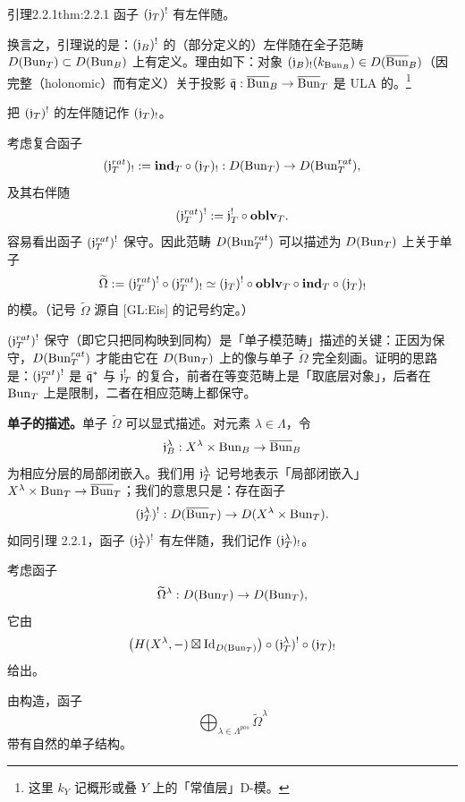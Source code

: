 \begin{othm}{引理}{2.2.1}{thm:2.2.1}
函子 $(\mathfrak{j}_T)^!$ 有左伴随。
\end{othm}

换言之，引理说的是：$(\mathfrak{j}_B)^!$ 的（部分定义的）左伴随在全子范畴 $D(\operatorname{Bun}_T)\subset D(\operatorname{Bun}_B)$ 上有定义。理由如下：对象 $(\mathfrak{j}_B)_!(k_{\operatorname{Bun}_B})\in D(\overline{\mathrm{Bun}}_B)$（因完整（holonomic）而有定义）关于投影 $\bar{\mathfrak{q}}:\overline{\mathrm{Bun}}_B\to\overline{\mathrm{Bun}}_T$ 是 ULA 的。\footnote{这里 $k_Y$ 记概形或叠 $Y$ 上的「常值层」D-模。}

把 $(\mathfrak{j}_T)^!$ 的左伴随记作 $(\mathfrak{j}_T)_!$。

考虑复合函子
\[
  (\mathfrak{j}^{rat}_T)_! := \mathbf{ind}_T\circ(\mathfrak{j}_T)_! : D(\operatorname{Bun}_T)\to D(\operatorname{Bun}^{rat}_T),
\]
及其右伴随
\[
  (\mathfrak{j}^{rat}_T)^! := \mathfrak{j}_T^!\circ \mathbf{oblv}_T .
\]
容易看出函子 $(\mathfrak{j}^{rat}_T)^!$ 保守。因此范畴 $D(\operatorname{Bun}^{rat}_T)$ 可以描述为 $D(\operatorname{Bun}_T)$ 上关于单子
\[
  \widetilde\Omega := (\mathfrak{j}^{rat}_T)^!\circ(\mathfrak{j}^{rat}_T)_!
  \simeq (\mathfrak{j}_T)^!\circ\mathbf{oblv}_T\circ\mathbf{ind}_T\circ(\mathfrak{j}_T)_!
\]
的模。（记号 $\widetilde\Omega$ 源自 [GL:Eis] 的记号约定。）

\begin{annote}
$(\mathfrak{j}^{rat}_T)^!$ 保守（即它只把同构映到同构）是「单子模范畴」描述的关键：正因为保守，$D(\operatorname{Bun}^{rat}_T)$ 才能由它在 $D(\operatorname{Bun}_T)$ 上的像与单子 $\widetilde\Omega$ 完全刻画。证明的思路是：$(\mathfrak{j}^{rat}_T)^!$ 是 $\bar{\mathfrak{q}}^*$ 与 $\mathfrak{j}_T^!$ 的复合，前者在等变范畴上是「取底层对象」，后者在 $\operatorname{Bun}_T$ 上是限制，二者在相应范畴上都保守。\par\vspace{0.15em}{\raggedleft 【来源：原书 p.4 §2.2.2（A）；译者按（上下文推断，无外部依据）】\par}
\end{annote}

\textbf{单子的描述。}单子 $\widetilde\Omega$ 可以显式描述。对元素 $\lambda\in\Lambda$，令
\[
  \mathfrak{j}_B^\lambda : X^\lambda\times\operatorname{Bun}_B\to\overline{\mathrm{Bun}}_B
\]
为相应分层的局部闭嵌入。我们用 $\mathfrak{j}_T^\lambda$ 记号地表示「局部闭嵌入」$X^\lambda\times\operatorname{Bun}_T\to\overline{\mathrm{Bun}}_T$；我们的意思只是：存在函子
\[
  (\mathfrak{j}_T^\lambda)^! : D(\overline{\mathrm{Bun}}_T)\to D(X^\lambda\times\operatorname{Bun}_T).
\]
如同引理 2.2.1，函子 $(\mathfrak{j}_T^\lambda)^!$ 有左伴随，我们记作 $(\mathfrak{j}_T^\lambda)_!$。

考虑函子
\[
  \widetilde\Omega^\lambda : D(\operatorname{Bun}_T)\to D(\operatorname{Bun}_T),
\]
它由
\[
  \bigl(H(X^\lambda,-)\boxtimes \mathrm{Id}_{D(\operatorname{Bun}_T)}\bigr)\circ(\mathfrak{j}_T^\lambda)^!\circ(\mathfrak{j}_T)_!
\]
给出。

由构造，函子
\[
  \bigoplus_{\lambda\in\Lambda^{pos}}\widetilde\Omega^\lambda
\]
带有自然的单子结构。


